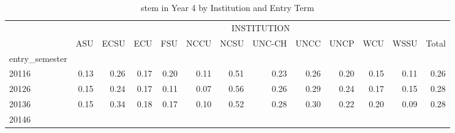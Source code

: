 \begin{table}[!h]
\caption{stem in Year 4 by Institution and Entry Term}
\centering
\begin{tabular}{lllllllllllll}
\cline{1-13}
\multicolumn{1}{c}{} &
  \multicolumn{12}{|c}{INSTITUTION} \\
\multicolumn{1}{c}{} &
  \multicolumn{1}{|r}{ASU} &
  \multicolumn{1}{r}{ECSU} &
  \multicolumn{1}{r}{ECU} &
  \multicolumn{1}{r}{FSU} &
  \multicolumn{1}{r}{NCCU} &
  \multicolumn{1}{r}{NCSU} &
  \multicolumn{1}{r}{UNC-CH} &
  \multicolumn{1}{r}{UNCC} &
  \multicolumn{1}{r}{UNCP} &
  \multicolumn{1}{r}{WCU} &
  \multicolumn{1}{r}{WSSU} &
  \multicolumn{1}{r}{Total} \\
\cline{1-13}
\multicolumn{1}{l}{entry\_semester} &
  \multicolumn{1}{|r}{} &
  \multicolumn{1}{r}{} &
  \multicolumn{1}{r}{} &
  \multicolumn{1}{r}{} &
  \multicolumn{1}{r}{} &
  \multicolumn{1}{r}{} &
  \multicolumn{1}{r}{} &
  \multicolumn{1}{r}{} &
  \multicolumn{1}{r}{} &
  \multicolumn{1}{r}{} &
  \multicolumn{1}{r}{} &
  \multicolumn{1}{r}{} \\
\multicolumn{1}{l}{\hspace{1em}20116} &
  \multicolumn{1}{|r}{0.13} &
  \multicolumn{1}{r}{0.26} &
  \multicolumn{1}{r}{0.17} &
  \multicolumn{1}{r}{0.20} &
  \multicolumn{1}{r}{0.11} &
  \multicolumn{1}{r}{0.51} &
  \multicolumn{1}{r}{0.23} &
  \multicolumn{1}{r}{0.26} &
  \multicolumn{1}{r}{0.20} &
  \multicolumn{1}{r}{0.15} &
  \multicolumn{1}{r}{0.11} &
  \multicolumn{1}{r}{0.26} \\
\multicolumn{1}{l}{\hspace{1em}20126} &
  \multicolumn{1}{|r}{0.15} &
  \multicolumn{1}{r}{0.24} &
  \multicolumn{1}{r}{0.17} &
  \multicolumn{1}{r}{0.11} &
  \multicolumn{1}{r}{0.07} &
  \multicolumn{1}{r}{0.56} &
  \multicolumn{1}{r}{0.26} &
  \multicolumn{1}{r}{0.29} &
  \multicolumn{1}{r}{0.24} &
  \multicolumn{1}{r}{0.17} &
  \multicolumn{1}{r}{0.15} &
  \multicolumn{1}{r}{0.28} \\
\multicolumn{1}{l}{\hspace{1em}20136} &
  \multicolumn{1}{|r}{0.15} &
  \multicolumn{1}{r}{0.34} &
  \multicolumn{1}{r}{0.18} &
  \multicolumn{1}{r}{0.17} &
  \multicolumn{1}{r}{0.10} &
  \multicolumn{1}{r}{0.52} &
  \multicolumn{1}{r}{0.28} &
  \multicolumn{1}{r}{0.30} &
  \multicolumn{1}{r}{0.22} &
  \multicolumn{1}{r}{0.20} &
  \multicolumn{1}{r}{0.09} &
  \multicolumn{1}{r}{0.28} \\
\multicolumn{1}{l}{\hspace{1em}20146} &

\end{tabular}
\end{table}

